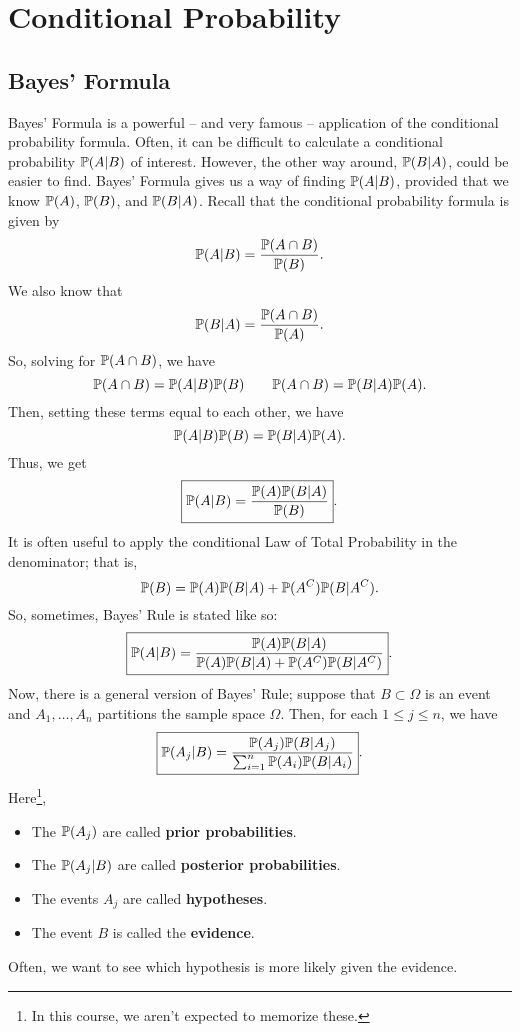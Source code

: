 \documentclass[letterpaper]{article}
\begin{document}
\section{Conditional Probability}
\subsection{Bayes' Formula}
Bayes' Formula is a powerful -- and very famous -- application of the conditional probability formula. Often, it can be difficult to calculate a conditional probability $\mathbb{P}(A | B)$ of interest. However, the other way around, $\mathbb{P}(B | A)$, could be easier to find. Bayes' Formula gives us a way of finding $\mathbb{P}(A | B)$, provided that we know $\mathbb{P}(A)$, $\mathbb{P}(B)$, and $\mathbb{P}(B | A)$. Recall that the conditional probability formula is given by 
\[\mathbb{P}(A | B) = \frac{\mathbb{P}(A \cap B)}{\mathbb{P}(B)}.\]
We also know that 
\[\mathbb{P}(B | A) = \frac{\mathbb{P}(A \cap B)}{\mathbb{P}(A)}.\]
So, solving for $\mathbb{P}(A \cap B)$, we have 
\[\mathbb{P}(A \cap B) = \mathbb{P}(A | B) \mathbb{P}(B) \qquad \mathbb{P}(A \cap B) = \mathbb{P}(B | A) \mathbb{P}(A).\]
Then, setting these terms equal to each other, we have 
\[\mathbb{P}(A | B) \mathbb{P}(B) = \mathbb{P}(B | A) \mathbb{P}(A).\]
Thus, we get 
\[\boxed{\mathbb{P}(A | B) = \frac{\mathbb{P}(A) \mathbb{P}(B | A)}{\mathbb{P}(B)}}.\]
It is often useful to apply the conditional Law of Total Probability in the denominator; that is,
\[\mathbb{P}(B) = \mathbb{P}(A) \mathbb{P}(B | A) + \mathbb{P}(A^C) \mathbb{P}(B | A^C).\]
So, sometimes, Bayes' Rule is stated like so:
\[\boxed{\mathbb{P}(A | B) = \frac{\mathbb{P}(A) \mathbb{P}(B | A)}{\mathbb{P}(A) \mathbb{P}(B | A) + \mathbb{P}(A^C) \mathbb{P}(B | A^C)}}.\]
Now, there is a general version of Bayes' Rule; suppose that $B \subset \Omega$ is an event and $A_1, \dots, A_n$ partitions the sample space $\Omega$. Then, for each $1 \leq j \leq n$, we have 
\[\boxed{\mathbb{P}(A_j | B) = \frac{\mathbb{P}(A_j) \mathbb{P}(B | A_j)}{\sum_{i = 1}^{n} \mathbb{P}(A_i) \mathbb{P}(B | A_i)}}.\]
Here\footnote{In this course, we aren't expected to memorize these.}, 
\begin{itemize}
    \item The $\mathbb{P}(A_j)$ are called \textbf{prior probabilities}.
    \item The $\mathbb{P}(A_j | B)$ are called \textbf{posterior probabilities}.
    \item The events $A_j$ are called \textbf{hypotheses}.
    \item The event $B$ is called the \textbf{evidence}.
\end{itemize}
Often, we want to see which hypothesis is more likely given the evidence.
\end{document}
